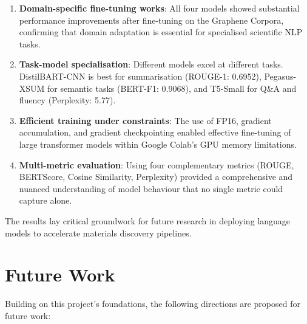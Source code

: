 \documentclass[12pt, a4paper]{report}
\begin{document}
\begin{enumerate}[leftmargin=*]
    \item \textbf{Domain-specific fine-tuning works}: All four models showed substantial performance improvements after fine-tuning on the Graphene Corpora, confirming that domain adaptation is essential for specialised scientific NLP tasks.

    \item \textbf{Task-model specialisation}: Different models excel at different tasks. DistilBART-CNN is best for summarisation (ROUGE-1: 0.6952), Pegasus-XSUM for semantic tasks (BERT-F1: 0.9068), and T5-Small for Q\&A and fluency (Perplexity: 5.77).

    \item \textbf{Efficient training under constraints}: The use of FP16, gradient accumulation, and gradient checkpointing enabled effective fine-tuning of large transformer models within Google Colab's GPU memory limitations.

    \item \textbf{Multi-metric evaluation}: Using four complementary metrics (ROUGE, BERTScore, Cosine Similarity, Perplexity) provided a comprehensive and nuanced understanding of model behaviour that no single metric could capture alone.
\end{enumerate}

The results lay critical groundwork for future research in deploying language models to accelerate materials discovery pipelines.

\chapter{Future Work}

Building on this project's foundations, the following directions are proposed for future work:
\end{document}

